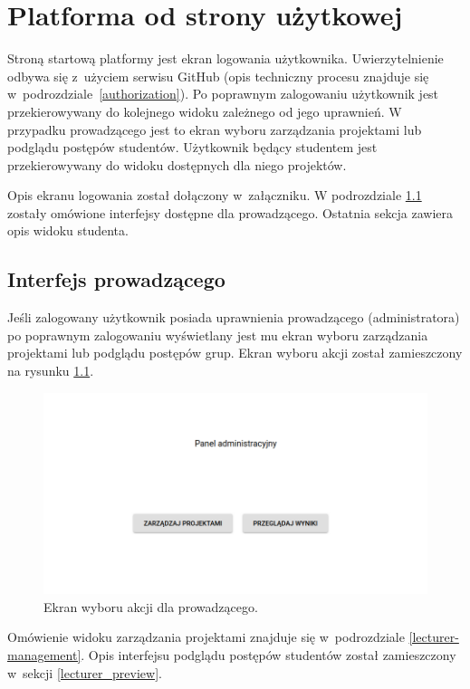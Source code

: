 \chapter{Platforma od strony użytkowej}
\label{chapter:interfaces}

Stroną startową platformy jest ekran logowania użytkownika.
Uwierzytelnienie odbywa się z~użyciem serwisu GitHub (opis techniczny procesu znajduje się w~podrozdziale~\ref{authorization}).
Po poprawnym zalogowaniu użytkownik jest przekierowywany do kolejnego widoku zależnego od jego uprawnień.
W przypadku prowadzącego jest to ekran wyboru zarządzania projektami lub podglądu postępów studentów.
Użytkownik będący studentem jest przekierowywany do widoku dostępnych dla niego projektów.

Opis ekranu logowania został dołączony w~załączniku.
W podrozdziale \ref{lecturer_ui} zostały omówione interfejsy dostępne dla prowadzącego.
Ostatnia sekcja zawiera opis widoku studenta.


\section{Interfejs prowadzącego}
\label{lecturer_ui}

Jeśli zalogowany użytkownik posiada uprawnienia prowadzącego (administratora) po poprawnym zalogowaniu wyświetlany jest mu ekran wyboru zarządzania projektami lub podglądu postępów grup.
Ekran wyboru akcji został zamieszczony na rysunku \ref{fig:lecturer_actions}.

\begin{figure}[h]
    \centering
    \includegraphics[width = 16cm]{chapter04/lecturer_actions.png}
    \caption{Ekran wyboru akcji dla prowadzącego.}
    \label{fig:lecturer_actions}
\end{figure}

Omówienie widoku zarządzania projektami znajduje się w~podrozdziale \ref{lecturer-management}.
Opis interfejsu podglądu postępów studentów został zamieszczony w~sekcji \ref{lecturer_preview}.

